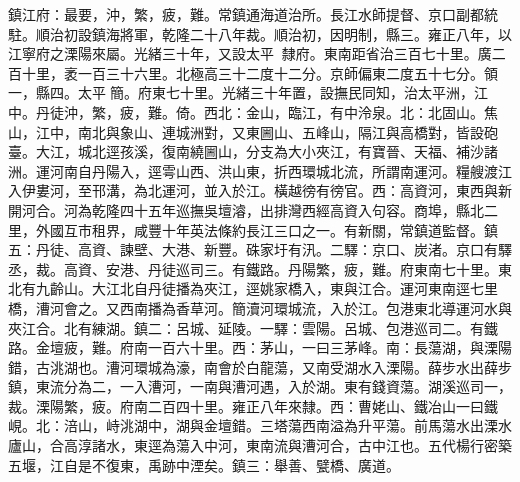 \begin{pinyinscope}
鎮江府：最要，沖，繁，疲，難。常鎮通海道治所。長江水師提督、京口副都統駐。順治初設鎮海將軍，乾隆二十八年裁。順治初，因明制，縣三。雍正八年，以江寧府之溧陽來屬。光緒三十年，又設太平，隸府。東南距省治三百七十里。廣二百十里，袤一百三十六里。北極高三十二度十二分。京師偏東二度五十七分。領一，縣四。太平簡。府東七十里。光緒三十年置，設撫民同知，治太平洲，江中。丹徒沖，繁，疲，難。倚。西北：金山，臨江，有中泠泉。北：北固山。焦山，江中，南北與象山、連城洲對，又東圌山、五峰山，隔江與高橋對，皆設砲臺。大江，城北逕孩溪，復南繞圌山，分支為大小夾江，有寶晉、天福、補沙諸洲。運河南自丹陽入，逕雩山西、洪山東，折西環城北流，所謂南運河。糧艘渡江入伊婁河，至邗溝，為北運河，並入於江。橫越徬有徬官。西：高資河，東西與新開河合。河為乾隆四十五年巡撫吳壇濬，出排灣西經高資入句容。商埠，縣北二里，外國互市租界，咸豐十年英法條約長江三口之一。有新關，常鎮道監督。鎮五：丹徒、高資、諫壁、大港、新豐。硃家圩有汛。二驛：京口、炭渚。京口有驛丞，裁。高資、安港、丹徒巡司三。有鐵路。丹陽繁，疲，難。府東南七十里。東北有九齡山。大江北自丹徒播為夾江，逕姚家橋入，東與江合。運河東南逕七里橋，漕河會之。又西南播為香草河。簡瀆河環城流，入於江。包港東北導運河水與夾江合。北有練湖。鎮二：呂城、延陵。一驛：雲陽。呂城、包港巡司二。有鐵路。金壇疲，難。府南一百六十里。西：茅山，一曰三茅峰。南：長蕩湖，與溧陽錯，古洮湖也。漕河環城為濠，南會於白龍蕩，又南受湖水入溧陽。薛步水出薛步鎮，東流分為二，一入漕河，一南與漕河遇，入於湖。東有錢資蕩。湖溪巡司一，裁。溧陽繁，疲。府南二百四十里。雍正八年來隸。西：曹姥山、鐵冶山一曰鐵峴。北：涪山，峙洮湖中，湖與金壇錯。三塔蕩西南溢為升平蕩。前馬蕩水出溧水廬山，合高淳諸水，東逕為蕩入中河，東南流與漕河合，古中江也。五代楊行密築五堰，江自是不復東，禹跡中湮矣。鎮三：舉善、甓橋、廣道。


\end{pinyinscope}